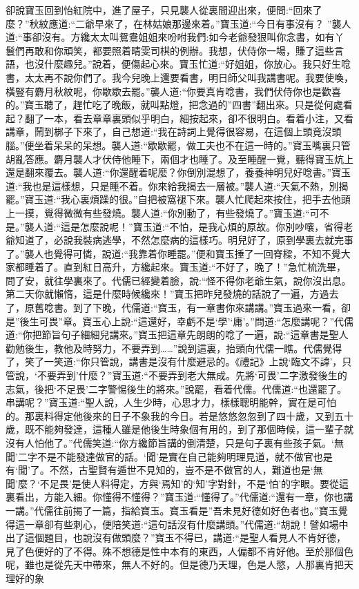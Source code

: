 \begin{parag}
    卻說寶玉回到怡紅院中，進了屋子，只見襲人從裏間迎出來，便問:“回來了麼？”秋紋應道:“二爺早來了，在林姑娘那邊來着。”寶玉道:“今日有事沒有？ ”襲人道:“事卻沒有。方纔太太叫鴛鴦姐姐來吩咐我們:如今老爺發狠叫你念書，如有丫鬟們再敢和你頑笑，都要照着晴雯司棋的例辦。我想，伏侍你一場，賺了這些言語，也沒什麼趣兒。”說着，便傷起心來。寶玉忙道:“好姐姐，你放心。我只好生唸書，太太再不說你們了。我今兒晚上還要看書，明日師父叫我講書呢。我要使喚，橫豎有麝月秋紋呢，你歇歇去罷。”襲人道:“你要真肯唸書，我們伏侍你也是歡喜的。”寶玉聽了，趕忙吃了晚飯，就叫點燈，把念過的”四書”翻出來。只是從何處看起？翻了一本，看去章章裏頭似乎明白，細按起來，卻不很明白。看着小注，又看講章，鬧到梆子下來了，自己想道:“我在詩詞上覺得很容易，在這個上頭竟沒頭腦。”便坐着呆呆的呆想。襲人道:“歇歇罷，做工夫也不在這一時的。”寶玉嘴裏只管胡亂答應。麝月襲人才伏侍他睡下，兩個才也睡了。及至睡醒一覺，聽得寶玉炕上還是翻來覆去。襲人道:“你還醒着呢麼？你倒別混想了，養養神明兒好唸書。”寶玉道:“我也是這樣想，只是睡不着。你來給我揭去一層被。”襲人道:“天氣不熱，別揭罷。”寶玉道:“我心裏煩躁的很。”自把被窩褪下來。襲人忙爬起來按住，把手去他頭上一摸，覺得微微有些發燒。襲人道:“你別動了，有些發燒了。”寶玉道:“可不是。”襲人道:“這是怎麼說呢！”寶玉道:“不怕，是我心煩的原故。你別吵嚷，省得老爺知道了，必說我裝病逃學，不然怎麼病的這樣巧。明兒好了，原到學裏去就完事了。”襲人也覺得可憐，說道:“我靠着你睡罷。”便和寶玉捶了一回脊樑，不知不覺大家都睡着了。直到紅日高升，方纔起來。寶玉道:“不好了，晚了！”急忙梳洗畢，問了安，就往學裏來了。代儒已經變着臉，說:“怪不得你老爺生氣，說你沒出息。第二天你就懶惰，這是什麼時候纔來！”寶玉把昨兒發燒的話說了一遍，方過去了，原舊唸書。到了下晚，代儒道:“寶玉，有一章書你來講講。”寶玉過來一看，卻是”後生可畏”章。寶玉心上說:“這還好，幸虧不是‘學’‘庸’。”問道:“怎麼講呢？”代儒道:“你把節旨句子細細兒講來。”寶玉把這章先朗朗的唸了一遍，說:“這章書是聖人勸勉後生，教他及時努力，不要弄到……”說到這裏，抬頭向代儒一瞧。代儒覺得了，笑了一笑道:“你只管說，講書是沒有什麼避忌的。《禮記》上說‘臨文不諱’，只管說，‘不要弄到’什麼？”寶玉道:“不要弄到老大無成。先將‘可畏’二字激發後生的志氣，後把‘不足畏’二字警惕後生的將來。”說罷，看着代儒。代儒道:“也還罷了。串講呢？”寶玉道:“聖人說，人生少時，心思才力，樣樣聰明能幹，實在是可怕的。那裏料得定他後來的日子不象我的今日。若是悠悠忽忽到了四十歲，又到五十歲，既不能夠發達，這種人雖是他後生時象個有用的，到了那個時候，這一輩子就沒有人怕他了。”代儒笑道:“你方纔節旨講的倒清楚，只是句子裏有些孩子氣。‘無聞’二字不是不能發達做官的話。‘聞’是實在自己能夠明理見道，就不做官也是有‘聞’了。不然，古聖賢有遁世不見知的，豈不是不做官的人，難道也是‘無聞’麼？‘不足畏’是使人料得定，方與‘焉知’的‘知’字對針，不是‘怕’的字眼。要從這裏看出，方能入細。你懂得不懂得？”寶玉道:“懂得了。”代儒道:“還有一章，你也講一講。”代儒往前揭了一篇，指給寶玉。寶玉看是”吾未見好德如好色者也。”寶玉覺得這一章卻有些刺心，便陪笑道:“這句話沒有什麼講頭。”代儒道:“胡說！譬如場中出了這個題目，也說沒有做頭麼？”寶玉不得已，講道:“是聖人看見人不肯好德，見了色便好的了不得。殊不想德是性中本有的東西，人偏都不肯好他。至於那個色呢，雖也是從先天中帶來，無人不好的。但是德乃天理，色是人慾，人那裏肯把天理好的象
\end{parag}
